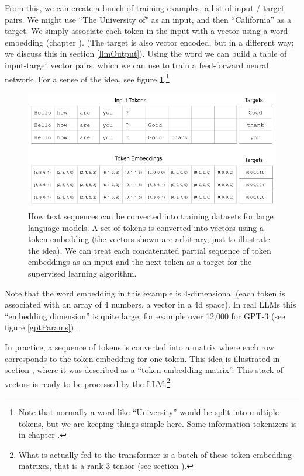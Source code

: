 From this, we can create a bunch of training examples, a list of input / target pairs. We might use ``The University of" as an input, and then ``California'' as a target. We simply associate each token in the input with a vector using a word embedding (chapter ). (The target is also vector encoded, but in a different way; we discuss this in section \ref{llmOutput}). Using the word we can build a table of input-target vector pairs, which we can use to train a feed-forward neural network. For a sense of the idea, see figure \ref{nextWordPrediction}.\footnote{Note that normally a word like ``University'' would be split into multiple tokens, but we are keeping things simple here. Some information tokenizers is in chapter .} 

\begin{figure}[h]
\centering
\includegraphics[scale=.45]{./images/contextWindow.png}
\caption[Jeff Yoshimi]{How text sequences can be converted into training datasets for large language models. A set of tokens is converted into vectors using a token embedding (the vectors shown are arbitrary, just to illustrate the idea). We can treat each concatenated partial sequence of token embeddings as an input and the next token as a target for the supervised learning algorithm. }
\label{nextWordPrediction}
\end{figure}

Note that the word embedding in this example is 4-dimensional (each token is associated with an array of 4 numbers, a vector in a 4d space). In real LLMs this ``embedding dimension'' is quite large, for example over 12,000 for GPT-3 (see figure \ref{gptParams}). 

In practice, a sequence of tokens is converted into a matrix where each row corresponds to the token embedding for one token. This idea is illustrated in section , where it was described as a ``token embedding matrix''. This stack of vectors is ready to be processed by the LLM.\footnote{What is actually fed to the transformer is  a batch of these token embedding matrixes, that is a rank-3 tensor (see section ).}

